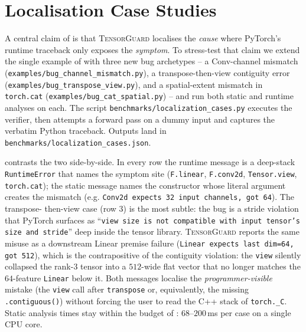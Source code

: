 \documentclass{article}
\theoremstyle{plain}
\theoremstyle{definition}
\newcommand{\TensorGuard}{\textsc{TensorGuard}}
\newcommand{\code}[1]{\texttt{\small #1}}
\begin{document}
\section{Localisation Case Studies}\label{sec:localization}

A central claim of  is that \TensorGuard{}
localises the \emph{cause} where PyTorch's runtime traceback only
exposes the \emph{symptom}.  To stress-test that claim we extend
the single example of  with three new bug
archetypes -- a Conv-channel mismatch (\code{examples/bug\_channel\_mismatch.py}),
a transpose-then-view contiguity error
(\code{examples/bug\_transpose\_view.py}), and a
spatial-extent mismatch in \code{torch.cat}
(\code{examples/bug\_cat\_spatial.py}) -- and run both static and
runtime analyses on each.  The script
\code{benchmarks/localization\_cases.py} executes the verifier,
then attempts a forward pass on a dummy input and captures the
verbatim Python traceback.  Outputs land in
\code{benchmarks/localization\_cases.json}.

 contrasts the two side-by-side.  In every
row the runtime message is a deep-stack \code{RuntimeError} that
names the symptom site (\code{F.linear}, \code{F.conv2d},
\code{Tensor.view}, \code{torch.cat}); the static message names the
constructor whose literal argument creates the mismatch (e.g.
\code{Conv2d expects 32 input channels, got 64}).  The transpose-
then-view case (row 3) is the most subtle: the bug is a stride
violation that PyTorch surfaces as ``\code{view size is not
compatible with input tensor's size and stride}'' deep inside the
tensor library.  \TensorGuard{} reports the same misuse as a
downstream Linear premise failure (\code{Linear expects last
dim=64, got 512}), which is the contrapositive of the contiguity
violation: the \code{view} silently collapsed the rank-3 tensor
into a $512$-wide flat vector that no longer matches the
$64$-feature \code{Linear} below it.  Both messages localise the
\emph{programmer-visible} mistake (the \code{view} call after
\code{transpose} or, equivalently, the missing \code{.contiguous()})
without forcing the user to read the C\nolinebreak[4]{}{}++ stack
of \code{torch.\_C}.  Static analysis times stay within the budget
of : $68$--$200$\,ms per case on a single
CPU core.
\end{document}
